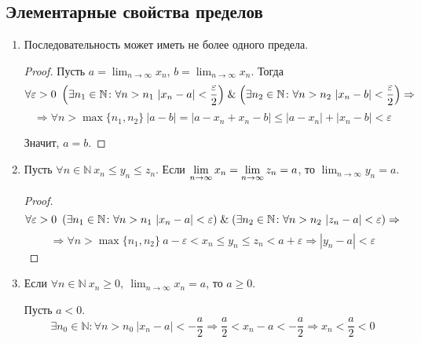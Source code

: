 \subsection{Элементарные свойства пределов}
\begin{enumerate}
	\item Последовательность может иметь не более одного предела.
	\begin{proof}
	Пусть $\displaystyle a = \lim_{n \to \infty} x_n$, $\displaystyle b = \lim_{n \to \infty} x_n$.
	Тогда
	\begin{equation*}
	\forall \varepsilon > 0 \
	\left( \exists n_1 \in \mathbb N \colon \forall n > n_1 \ |x_n - a| < \frac\varepsilon2 \right) \mathrel{\&}
	\left( \exists n_2 \in \mathbb N \colon \forall n > n_2 \ |x_n - b| < \frac\varepsilon2 \right) \Rightarrow
	\end{equation*}
	\begin{equation*}
	\Rightarrow \forall n > \max \{ n_1, n_2 \} \ |a - b| = |a - x_n + x_n - b| \leqslant |a - x_n| + |x_n - b| < \varepsilon
	\end{equation*}
	
	Значит, $a = b$.
	\end{proof}
	
	\item \begin{theorem}
	Пусть $\forall n \in \mathbb N \ x_n \leqslant y_n \leqslant z_n$.
	Если $\displaystyle \lim_{n \to \infty} x_n \opbr= \lim_{n \to \infty} z_n \opbr= a$, то $\displaystyle \lim_{n \to \infty} y_n = a$.
	\end{theorem}
	\begin{proof}
	\begin{equation*}
	\forall \varepsilon > 0 \
	\left( \exists n_1 \in \mathbb N \colon \forall n > n_1 \ |x_n - a| < \varepsilon \right) \mathrel{\&}
	\left( \exists n_2 \in \mathbb N \colon \forall n > n_2 \ |z_n - a| < \varepsilon \right) \Rightarrow
	\end{equation*}
	\begin{equation*}
	\Rightarrow \forall n > \max \{ n_1, n_2 \} \ a - \varepsilon < x_n \leqslant y_n \leqslant z_n < a + \varepsilon \Rightarrow |y_n - a| < \varepsilon
	\end{equation*}
	\end{proof}
	
	\item Если $\displaystyle \forall n \in \mathbb N \ x_n \geqslant 0, \ \lim_{n \to \infty} x_n = a$, то $a \geqslant 0$.
	\begin{proofcontra}
	Пусть $a < 0$.
	\begin{equation*}
	\exists n_0 \in \mathbb N \colon \forall n > n_0 \ |x_n - a| < -\frac{a}2 \Rightarrow
	\frac{a}2 < x_n - a < -\frac{a}2 \Rightarrow
	x_n < \frac{a}2 < 0
	\end{equation*}
	

\end{proofcontra}
\end{enumerate}
